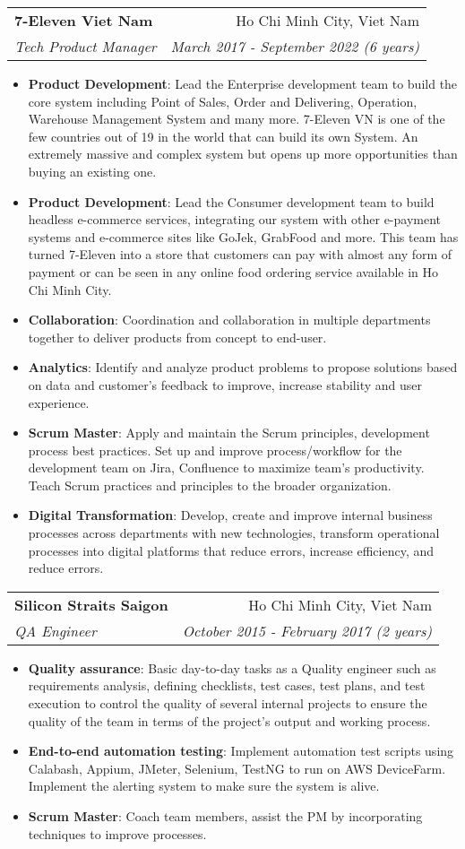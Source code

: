 \documentclass[letterpaper,11pt]{article}
\makeatletter
\newcommand{\resumeItem}[2]{
  \item\small{
    \textbf{#1}{: #2 \vspace{-2pt}}
  }
}
\newcommand{\resumeSubheading}[4]{
  \vspace{-1pt}\item
    \begin{tabular*}{0.97\textwidth}[t]{l@{\extracolsep{\fill}}r}
      \textbf{#1} & #2 \\
      \textit{\small#3} & \textit{\small #4} \\
    \end{tabular*}\vspace{-5pt}
}
\newcommand{\resumeItemListStart}{\begin{itemize}}
\newcommand{\resumeItemListEnd}{\end{itemize}\vspace{-5pt}}
\makeatother
\begin{document}
    \resumeSubheading
      {7-Eleven Viet Nam}{Ho Chi Minh City, Viet Nam}
      {Tech Product Manager}{March 2017 - September 2022 (6 years)}
      \resumeItemListStart
        \resumeItem{Product Development}
        {Lead the Enterprise development team to build the core system including Point of Sales, Order and Delivering, Operation, Warehouse Management System and many more. 7-Eleven VN is one of the few countries out of 19 in the world that can build its own System. An extremely massive and complex system but opens up more opportunities than buying an existing one.}
        \resumeItem{Product Development}
        {Lead the Consumer development team to build headless e-commerce services, integrating our system with other e-payment systems and e-commerce sites like GoJek, GrabFood and more. This team has turned 7-Eleven into a store that customers can pay with almost any form of payment or can be seen in any online food ordering service available in Ho Chi Minh City.}
        \resumeItem{Collaboration}
        {Coordination and collaboration in multiple departments together to deliver products from concept to end-user.}
        \resumeItem{Analytics}
        {Identify and analyze product problems to propose solutions based on data and customer's feedback to improve, increase stability and user experience.}
        \resumeItem{Scrum Master}
        {Apply and maintain the Scrum principles, development process best practices. Set up and improve process/workflow for the development team on Jira, Confluence to maximize team's productivity. Teach Scrum practices and principles to the broader organization.}
        \resumeItem{Digital Transformation}
        {Develop, create and improve internal business processes across departments with new technologies, transform operational processes into digital platforms that reduce errors, increase efficiency, and reduce errors.}
    \resumeItemListEnd

    \resumeSubheading
      {Silicon Straits Saigon}{Ho Chi Minh City, Viet Nam}
      {QA Engineer}{October 2015 - February 2017 (2 years)}
      \resumeItemListStart
        \resumeItem{Quality assurance}
            {Basic day-to-day tasks as a Quality engineer such as requirements analysis, defining checklists, test cases, test plans, and test execution to control the quality of several internal projects to ensure the quality of the team in terms of the project's output and working process.}
        \resumeItem{End-to-end automation testing}
            {Implement automation test scripts using Calabash, Appium, JMeter, Selenium, TestNG to run on AWS DeviceFarm. Implement the alerting system to make sure the system is alive.}
        \resumeItem{Scrum Master}
            {Coach team members, assist the PM by incorporating techniques to improve processes.}
      \resumeItemListEnd
\end{document}
